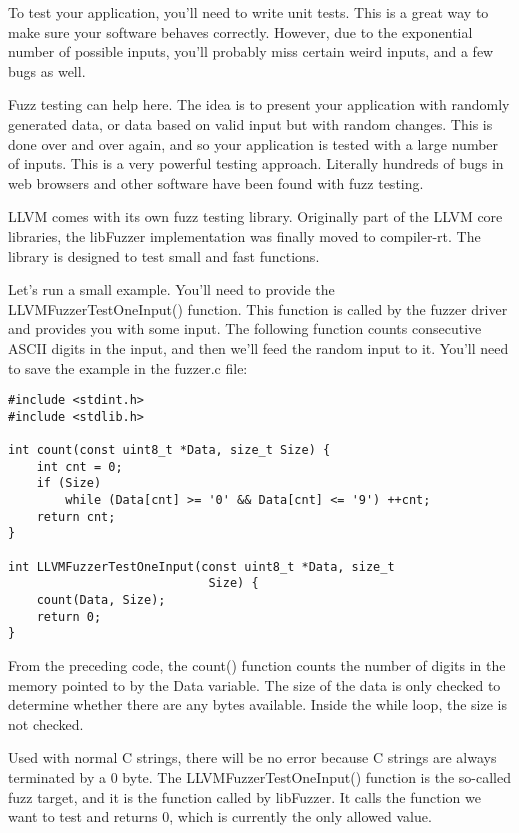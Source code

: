
To test your application, you'll need to write unit tests. This is a great way to make sure your software behaves correctly. However, due to the exponential number of possible inputs, you'll probably miss certain weird inputs, and a few bugs as well.\par

Fuzz testing can help here. The idea is to present your application with randomly generated data, or data based on valid input but with random changes. This is done over and over again, and so your application is tested with a large number of inputs. This is a very powerful testing approach. Literally hundreds of bugs in web browsers and other software have been found with fuzz testing.\par

LLVM comes with its own fuzz testing library. Originally part of the LLVM core libraries, the libFuzzer implementation was finally moved to compiler-rt. The library is designed to test small and fast functions.\par

Let's run a small example. You'll need to provide the LLVMFuzzerTestOneInput() function. This function is called by the fuzzer driver and provides you with some input. The following function counts consecutive ASCII digits in the input, and then we'll feed the random input to it. You'll need to save the example in the fuzzer.c file:\par

\begin{lstlisting}[caption={}]
#include <stdint.h>
#include <stdlib.h>

int count(const uint8_t *Data, size_t Size) {
	int cnt = 0;
	if (Size)
		while (Data[cnt] >= '0' && Data[cnt] <= '9') ++cnt;
	return cnt;
}

int LLVMFuzzerTestOneInput(const uint8_t *Data, size_t
							Size) {
	count(Data, Size);
	return 0;
}
\end{lstlisting}

From the preceding code, the count() function counts the number of digits in the memory pointed to by the Data variable. The size of the data is only checked to determine whether there are any bytes available. Inside the while loop, the size is not checked.\par

Used with normal C strings, there will be no error because C strings are always terminated by a 0 byte. The LLVMFuzzerTestOneInput() function is the so-called fuzz target, and it is the function called by libFuzzer. It calls the function we want to test and returns 0, which is currently the only allowed value.\par


